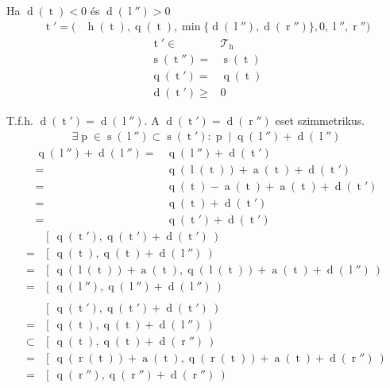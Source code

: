 \documentclass{article}
\newcommand*{\Trees}{\ensuremath{\mathcal{T}}}
\newcommand*{\sAccumulated}[1]{\ensuremath{\operatorname{a}\left(#1\right)}}
\newcommand*{\sDiff}[1]{\ensuremath{\operatorname{d}\left(#1\right)}}
\newcommand*{\sHeight}[1]{\ensuremath{\operatorname{h}\left(#1\right)}}
\newcommand*{\sLeft}[1]{\ensuremath{\operatorname{l}\left(#1\right)}}
\newcommand*{\sPosition}[1]{\ensuremath{\operatorname{q}\left(#1\right)}}
\newcommand*{\sPrimes}[1]{\ensuremath{\operatorname{s}\left(#1\right)}}
\newcommand*{\sRight}[1]{\ensuremath{\operatorname{r}\left(#1\right)}}
\newcommand*{\vH}{\ensuremath{\operatorname{h}}}
\newcommand*{\vL}{\ensuremath{\operatorname{l}}}
\newcommand*{\vP}{\ensuremath{\operatorname{p}}}
\newcommand*{\vR}{\ensuremath{\operatorname{r}}}
\newcommand*{\vT}{\ensuremath{\operatorname{t}}}
\begin{document}
Ha $ \sDiff{\vT} < 0 $ és $ \sDiff{\vL''} > 0 $
\begin{align*}
\vT' = ( & \sHeight{\vT}, \sPosition{\vT},
	\min\{\sDiff{\vL''}, \sDiff{\vR''}\},
	0, \vL'', \vR'')
\end{align*}
\begin{align*}
\vT' \in& \Trees_{\vH} \tag{F1} \\
\sPrimes{\vT''} =& \sPrimes{\vT} \tag{F2} \\
\sPosition{\vT'} =& \sPosition{\vT} \tag{F3} \\
\sDiff{\vT'} \ge& 0 \tag{F4}
\end{align*}

T.f.h. $ \sDiff{\vT'} = \sDiff{\vL''} $.
A $ \sDiff{\vT'} = \sDiff{\vR''} $ eset szimmetrikus.
\begin{align*}
\exists \vP \in \sPrimes{\vL''} \subset \sPrimes{\vT'}:
	\vP \mid \sPosition{\vL''} + \sDiff{\vL''}
\end{align*}
\begin{align*}
\sPosition{\vL''} + \sDiff{\vL''}
	=& \sPosition{\vL''} + \sDiff{\vT'} \\
	=& \sPosition{\sLeft{\vT}} + \sAccumulated{\vT} + \sDiff{\vT'} \\
	=& \sPosition{\vT} - \sAccumulated{\vT} + \sAccumulated{\vT} + \sDiff{\vT'} \\
	=& \sPosition{\vT} + \sDiff{\vT'} \\
	=& \sPosition{\vT'} + \sDiff{\vT'} \tag{I1}
\end{align*}
\begin{align*}
& \left[\ \sPosition{\vT'} , \sPosition{\vT'} + \sDiff{\vT'}\ \right) \\
= & \left[\ \sPosition{\vT} , \sPosition{\vT} + \sDiff{\vL''}\ \right) \\
= & \left[\ \sPosition{\sLeft{\vT}} + \sAccumulated{\vT},
	\sPosition{\sLeft{\vT}} + \sAccumulated{\vT} + \sDiff{\vL''}\ \right) \\
= & \left[\ \sPosition{\vL''} , \sPosition{\vL''} + \sDiff{\vL''}\ \right)\\
\\
& \left[\ \sPosition{\vT'} , \sPosition{\vT'} + \sDiff{\vT'}\ \right) \\
= & \left[\ \sPosition{\vT} , \sPosition{\vT} + \sDiff{\vL''}\ \right) \\
\subset & \left[\ \sPosition{\vT} , \sPosition{\vT} + \sDiff{\vR''}\ \right) \\
= & \left[\ \sPosition{\sRight{\vT}} + \sAccumulated{\vT},
	\sPosition{\sRight{\vT}} + \sAccumulated{\vT} + \sDiff{\vR''}\ \right) \\
= & \left[\ \sPosition{\vR''} , \sPosition{\vR''} + \sDiff{\vR''}\ \right)
	\tag{I2}
\end{align*}
\end{document}
